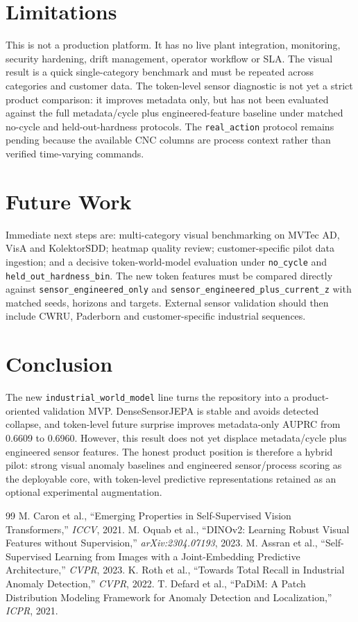 \documentclass[10pt,conference]{IEEEtran}
\begin{document}
\section{Limitations}
This is not a production platform. It has no live plant integration, monitoring, security hardening, drift management, operator workflow or SLA. The visual result is a quick single-category benchmark and must be repeated across categories and customer data. The token-level sensor diagnostic is not yet a strict product comparison: it improves metadata only, but has not been evaluated against the full metadata/cycle plus engineered-feature baseline under matched no-cycle and held-out-hardness protocols. The \texttt{real\_action} protocol remains pending because the available CNC columns are process context rather than verified time-varying commands.

\section{Future Work}
Immediate next steps are: multi-category visual benchmarking on MVTec AD, VisA and KolektorSDD; heatmap quality review; customer-specific pilot data ingestion; and a decisive token-world-model evaluation under \texttt{no\_cycle} and \texttt{held\_out\_hardness\_bin}. The new token features must be compared directly against \texttt{sensor\_engineered\_only} and \texttt{sensor\_engineered\_plus\_current\_z} with matched seeds, horizons and targets. External sensor validation should then include CWRU, Paderborn and customer-specific industrial sequences.

\section{Conclusion}
The new \texttt{industrial\_world\_model} line turns the repository into a product-oriented validation MVP. DenseSensorJEPA is stable and avoids detected collapse, and token-level future surprise improves metadata-only AUPRC from 0.6609 to 0.6960. However, this result does not yet displace metadata/cycle plus engineered sensor features. The honest product position is therefore a hybrid pilot: strong visual anomaly baselines and engineered sensor/process scoring as the deployable core, with token-level predictive representations retained as an optional experimental augmentation.

\begin{thebibliography}{99}
 M. Caron et al., ``Emerging Properties in Self-Supervised Vision Transformers,'' \emph{ICCV}, 2021.
 M. Oquab et al., ``DINOv2: Learning Robust Visual Features without Supervision,'' \emph{arXiv:2304.07193}, 2023.
 M. Assran et al., ``Self-Supervised Learning from Images with a Joint-Embedding Predictive Architecture,'' \emph{CVPR}, 2023.
 K. Roth et al., ``Towards Total Recall in Industrial Anomaly Detection,'' \emph{CVPR}, 2022.
 T. Defard et al., ``PaDiM: A Patch Distribution Modeling Framework for Anomaly Detection and Localization,'' \emph{ICPR}, 2021.
\end{thebibliography}
\end{document}
